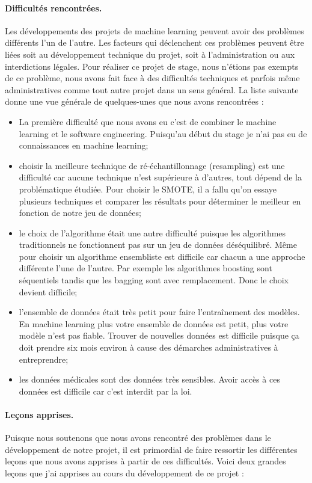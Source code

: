 \documentclass[12pt, french]{report}
\begin{document}
\paragraph{Difficultés rencontrées. } 
Les développements des projets de machine learning peuvent avoir des problèmes différents  l'un de l'autre. Les facteurs qui déclenchent ces problèmes peuvent être liées soit au développement technique du projet, soit à l'administration ou aux interdictions légales. Pour réaliser ce projet de stage, nous n'étions pas exempts de ce problème, nous avons fait face à des difficultés techniques et parfois même administratives comme tout autre projet dans un sens général. La liste suivante donne une vue générale de quelques-unes que nous avons rencontrées :
\begin{itemize}
\item La première difficulté que nous avons eu c'est de combiner le machine learning et le software engineering. Puisqu'au début du stage je n'ai pas eu de connaissances en machine learning;
\item choisir la meilleure technique de ré-échantillonnage (resampling) est une difficulté car aucune technique n'est supérieure à d'autres, tout dépend de la problématique étudiée. Pour choisir le SMOTE, il a fallu qu'on essaye plusieurs techniques et comparer les résultats pour déterminer le meilleur en fonction de notre jeu de données;
\item le choix de l'algorithme était une autre difficulté puisque les algorithmes traditionnels ne fonctionnent pas sur un jeu de données déséquilibré. Même pour choisir un algorithme ensembliste est difficile car chacun a une approche différente l'une de l'autre. Par exemple les algorithmes boosting sont séquentiels tandis que les bagging sont avec remplacement. Donc le choix devient difficile;
\item l'ensemble de données était très petit pour faire l'entraînement des modèles. En machine learning plus votre ensemble de données est petit, plus votre modèle n'est pas fiable. Trouver de nouvelles données est difficile puisque ça doit prendre six mois environ à cause des démarches administratives à entreprendre;
\item les données médicales sont des données très sensibles. Avoir accès à ces données est difficile car c'est interdit par la loi.  
\end{itemize}

\paragraph{Leçons apprises. } 
Puisque nous soutenons que nous avons rencontré des problèmes dans le développement de notre projet, il est primordial de faire ressortir les différentes leçons que nous avons apprises à partir de ces difficultés. Voici deux grandes leçons que j'ai apprises au cours du développement de ce projet : 
\end{document}
